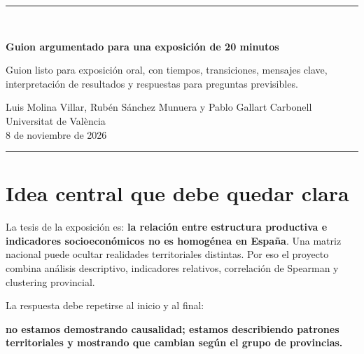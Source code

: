 \documentclass[11pt,a4paper]{article}
\begin{document}
\begin{titlepage}
\centering\vspace*{1.4cm}
{\color{azul}\rule{\textwidth}{1.5pt}}\\[0.8cm]
{\Huge\bfseries Guion argumentado para una exposición de 20 minutos\par}
\vspace{0.5cm}{\Large Estructura Productiva, Presión Inmobiliaria y su Impacto en el Ciclo Vital y Migratorio en España\par}
\vspace{1.5cm}
\begin{minipage}{0.85\textwidth}\small\centering
Guion listo para exposición oral, con tiempos, transiciones, mensajes clave, interpretación de resultados y respuestas para preguntas previsibles.
\end{minipage}
\vfill
{\large Luis Molina Villar, Rubén Sánchez Munuera y Pablo Gallart Carbonell\\ Universitat de València\\[0.3cm]8 de noviembre de 2026\par}
{\color{azul}\rule{\textwidth}{1.5pt}}
\end{titlepage}
\tableofcontents\newpage

\section{Idea central que debe quedar clara}
La tesis de la exposición es: \textbf{la relación entre estructura productiva e indicadores socioeconómicos no es homogénea en España}. Una matriz nacional puede ocultar realidades territoriales distintas. Por eso el proyecto combina análisis descriptivo, indicadores relativos, correlación de Spearman y clustering provincial.

La respuesta debe repetirse al inicio y al final: \colorbox{azulclaro}{\parbox{0.92\textwidth}{\centering\textbf{no estamos demostrando causalidad; estamos describiendo patrones territoriales y mostrando que cambian según el grupo de provincias.}}}
\end{document}
